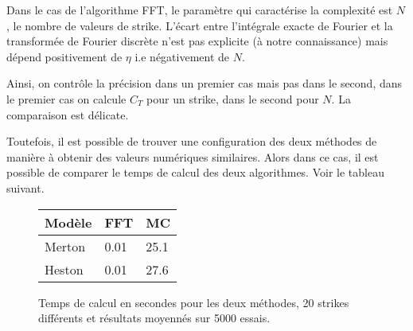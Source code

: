 \documentclass{article}
\begin{document}
Dans le cas de l'algorithme FFT, le paramètre qui caractérise la complexité est $N$, le nombre de valeurs de strike. L'écart entre l'intégrale exacte de Fourier et la transformée de Fourier discrète n'est pas explicite (à notre connaissance) mais dépend positivement de $\eta$ i.e négativement de $N$.

Ainsi, on contrôle la précision dans un premier cas mais pas dans le second, dans le premier cas on calcule $C_T$ pour un strike, dans le second pour $N$. La comparaison est délicate. 

Toutefois, il est possible de trouver une configuration des deux méthodes de manière à obtenir des valeurs numériques similaires. Alors dans ce cas, il est possible de comparer le temps de calcul des deux algorithmes. Voir le tableau suivant.
\begin{figure}
	\centering
\begin{tabular}{lll}
	Modèle & FFT & MC\\
	\hline
	Merton & 0.01 & 25.1\\
	Heston & 0.01 & 27.6\\
\end{tabular}
\caption{Temps de calcul en secondes pour les deux méthodes, 20 strikes différents et résultats moyennés sur 5000 essais.}
\end{figure}
\end{document}
